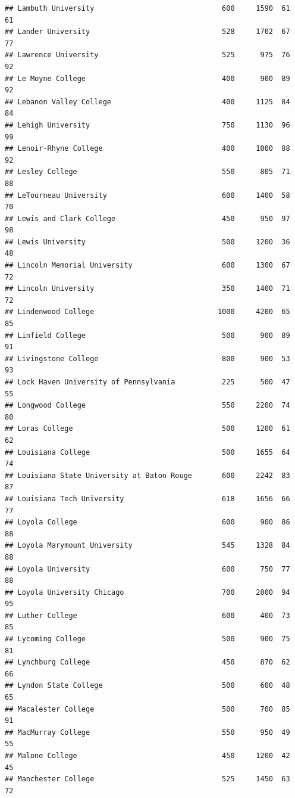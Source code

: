 \documentclass[
]{article}
\begin{document}
\begin{verbatim}
## Lambuth University                              600     1590  61       61
## Lander University                               528     1702  67       77
## Lawrence University                             525      975  76       92
## Le Moyne College                                400      900  89       92
## Lebanon Valley College                          400     1125  84       84
## Lehigh University                               750     1130  96       99
## Lenoir-Rhyne College                            400     1000  88       92
## Lesley College                                  550      805  71       88
## LeTourneau University                           600     1400  58       70
## Lewis and Clark College                         450      950  97       98
## Lewis University                                500     1200  36       48
## Lincoln Memorial University                     600     1300  67       72
## Lincoln University                              350     1400  71       72
## Lindenwood College                             1000     4200  65       85
## Linfield College                                500      900  89       91
## Livingstone College                             800      900  53       93
## Lock Haven University of Pennsylvania           225      500  47       55
## Longwood College                                550     2200  74       80
## Loras College                                   500     1200  61       62
## Louisiana College                               500     1655  64       74
## Louisiana State University at Baton Rouge       600     2242  83       87
## Louisiana Tech University                       618     1656  66       77
## Loyola College                                  600      900  86       88
## Loyola Marymount University                     545     1328  84       88
## Loyola University                               600      750  77       88
## Loyola University Chicago                       700     2000  94       95
## Luther College                                  600      400  73       85
## Lycoming College                                500      900  75       81
## Lynchburg College                               450      870  62       66
## Lyndon State College                            500      600  48       65
## Macalester College                              500      700  85       91
## MacMurray College                               550      950  49       55
## Malone College                                  450     1200  42       45
## Manchester College                              525     1450  63       72

\end{verbatim}
\end{document}
